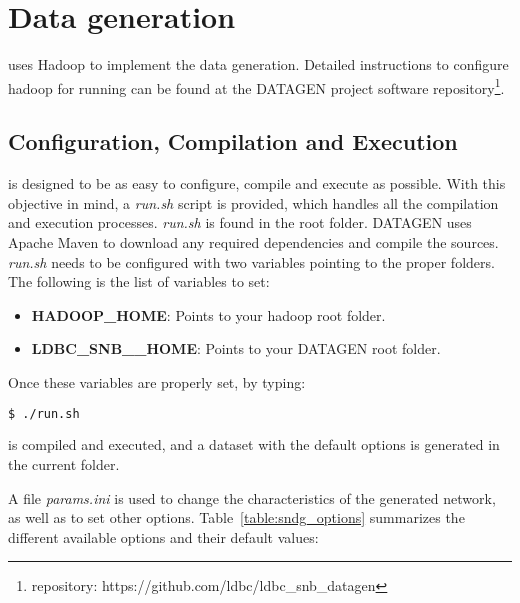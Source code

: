 \section{Data generation}\label{section:data_generation}

\datagen uses Hadoop to implement the data generation. Detailed instructions
to configure hadoop for running \datagen can be found at the DATAGEN project
software repository\footnote{ \datagen repository:
https://github.com/ldbc/ldbc\_snb\_datagen}. 

\subsection{\datagen Configuration, Compilation and Execution}

\datagen is designed to be as easy to configure, compile and execute as
possible. With this objective in mind, a \textit{run.sh} script is provided,
which handles all the compilation and execution processes.  \textit{run.sh}
is found in the \datagen root folder. DATAGEN uses Apache Maven to download any
required dependencies and compile the sources.  \textit{run.sh} needs to be
configured with two variables pointing to the proper folders. The following is
the list of variables to set:

\begin{itemize}
    \item \textbf{HADOOP\_HOME}: Points to your hadoop root folder.
    \item \textbf{LDBC\_SNB\_\datagen\_HOME}: Points to your DATAGEN root folder.
\end{itemize}

Once these variables are properly set, by typing:

\begin{lstlisting}[backgroundcolor=\color{gray}, frame=single, language=bash]
$ ./run.sh
\end{lstlisting}

\datagen is compiled and executed, and a dataset with the default options is
generated in the current folder.

A file \textit{params.ini} is used to change the characteristics of the
generated network, as well as to set other options. Table~\ref{table:sndg_options}
summarizes the different available options and their default values:

